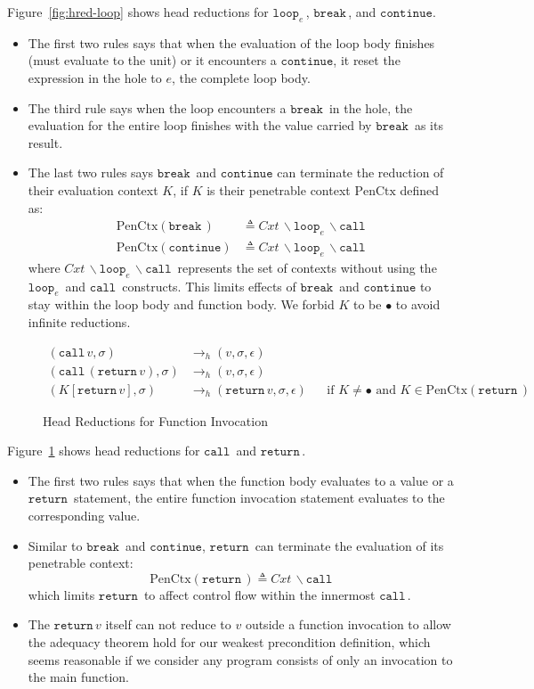 \documentclass{article}
\numberwithin{algorithm}{section}
\newcommand{\cloop}[1]{\texttt{loop}_{#1}\,}
\newcommand{\cbreak}{\texttt{break}\,}
\newcommand{\ccontinue}{\texttt{continue}}
\newcommand{\creturn}{\texttt{return}\,}
\newcommand{\ccall}{\texttt{call}\,}
\newcommand{\pure}[1]{\text{PenCtx}(#1)}
\newcommand{\hred}{\rightarrow_h}
\begin{document}
Figure~\ref{fig:hred-loop} shows head reductions for $\cloop{e}\!$, $\cbreak\!$, and $\ccontinue$.
\begin{itemize}
\item The first two rules says that when the evaluation of the loop body finishes (must evaluate to the unit) or it encounters a $\ccontinue$, it reset the expression in the hole to $e$, the complete loop body.
\item The third rule says when the loop encounters a $\cbreak\!$ in the hole, the evaluation for the entire loop finishes with the value carried by $\cbreak\!$ as its result.
\item The last two rules says $\cbreak\!$ and $\ccontinue$ can terminate the reduction of their evaluation context $K$, if $K$ is their penetrable context $\text{PenCtx}$ defined as:
$$
\begin{aligned}
    \pure{\cbreak\!} &\triangleq \textit{Cxt}\,\backslash\cloop{e}\!\backslash\ccall \\
    \pure{\ccontinue} &\triangleq \textit{Cxt}\,\backslash\cloop{e}\!\backslash\ccall
\end{aligned}
$$
where $\textit{Cxt}\,\backslash\cloop{e}\!\backslash\ccall\!$ represents the set of contexts without using the $\cloop{e}\!$ and $\ccall\!$ constructs.
This limits effects of $\cbreak\!$ and $\ccontinue$ to stay within the loop body and function body.
We forbid $K$ to be $\bullet$ to avoid infinite reductions.
\end{itemize}

\begin{figure}[h]
$$
\begin{aligned}
    (\ccall v, \sigma) &\hred (v, \sigma, \epsilon) \\
    (\ccall (\creturn v), \sigma) &\hred (v, \sigma, \epsilon) \\
    (K[\creturn v], \sigma) &\hred (\creturn v, \sigma, \epsilon) && \text{if } K \neq \bullet \text{ and } K \in \pure{\creturn\!}
\end{aligned}
$$
\caption{Head Reductions for Function Invocation}
\label{fig:hred-func}
\end{figure}

Figure~\ref{fig:hred-func} shows head reductions for $\ccall\!$ and $\creturn\!$.
\begin{itemize}
\item The first two rules says that when the function body evaluates to a value or a $\creturn\!$ statement, the entire function invocation statement evaluates to the corresponding value.
\item Similar to $\cbreak\!$ and $\ccontinue$, $\creturn\!$ can terminate the evaluation of its penetrable context:
$$
\pure{\creturn\!} \triangleq \textit{Cxt}\,\backslash\ccall
$$
which limits $\creturn\!$ to affect control flow within the innermost $\ccall\!$.
\item The $\creturn v$ itself can not reduce to $v$ outside a function invocation to allow the adequacy theorem hold for our weakest precondition definition, which seems reasonable if we consider any program consists of only an invocation to the main function.
\end{itemize}
\end{document}
